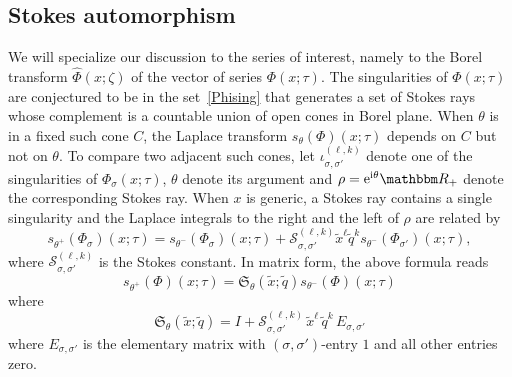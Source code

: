 \documentclass[12pt,reqno]{amsart}
\theoremstyle{definition}
\def\BR{\mathbbm R}
\def\s{\sigma}
\def\tq{\tilde{q}}
\def\tx{\tilde{x}}
\def\th{\theta}
\def\ri{\mathrm{i}}
\def\tx{\tilde{x}}
\def\re{{\rm e}}
\def\ri{{\rm i}}
\def\mc{\mathcal}
\def\mfS{\mathfrak{S}}
\newcommand{\wh}[1]{\widehat{#1}}
\begin{document}
\subsection{Stokes automorphism}
\label{sub.stokes}

We will specialize our discussion to the series of interest, namely to
the Borel transform $\wh{\Phi}(x;\zeta)$ of the vector of series
$\Phi(x;\tau)$. The singularities of $\Phi(x;\tau)$ are conjectured to
be in the set~\eqref{Phising} that generates a set of Stokes rays
whose complement is a countable union of open cones in Borel plane.
When $\th$ is in a fixed such cone $C$, the Laplace transform
$s_\th(\Phi)(x;\tau)$ depends on $C$ but not on $\th$.  To compare two
adjacent such cones, let $\iota_{\s,\s'}^{(\ell,k)}$ denote one of the
singularities of $\Phi_\s(x;\tau)$, $\theta$ denote its argument and
$\rho=\re^{\ri\theta}\BR_+$ denote the corresponding Stokes ray.  When
$x$ is generic, a Stokes ray contains a single singularity and the
Laplace integrals to the right and the left of $\rho$ are related by
\begin{equation}
  s_{\theta^+}(\Phi_\s)(x;\tau) =  s_{\theta^-}(\Phi_\s)(x;\tau) +
  \mc{S}_{\s,\s'}^{(\ell,k)}\tx^\ell \tq^k
  s_{\theta^-}(\Phi_{\s'})(x;\tau),
  \label{eq:Sauto}
\end{equation}
where $\mc{S}_{\s,\s'}^{(\ell,k)}$ is the Stokes constant. In matrix
form, the above formula reads
\begin{equation}
\label{lap2}
  s_{\theta^+}(\Phi)(x;\tau) =
  \mfS_{\theta}(\tx;\tq) s_{\theta^-}(\Phi)(x;\tau) 
\end{equation}
where
\begin{equation}
\label{Grho}
\mfS_\th(\tx;\tq)=
I + \mc{S}_{\s,\s'}^{(\ell,k)}\, \tx^\ell \, \tq^k \, E_{\s,\s'}
\end{equation}
where $E_{\s,\s'}$ is the elementary matrix with $(\s,\s')$-entry $1$
and all other entries zero.
\end{document}
